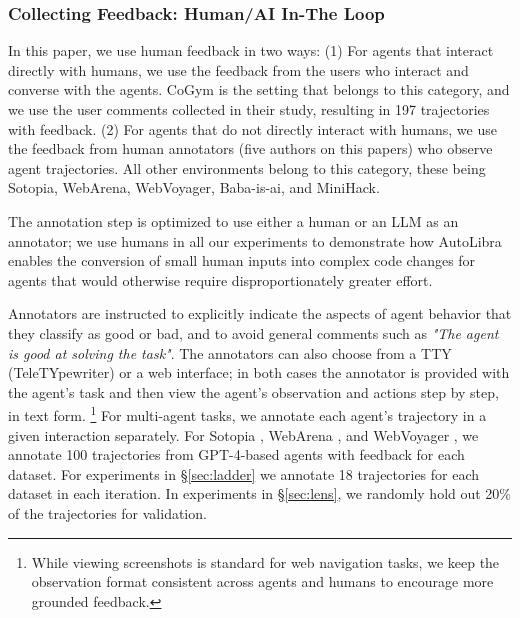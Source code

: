 \subsubsection{Collecting Feedback: Human/AI In-The Loop}
\label{sec:collecting-human-feedback}
In this paper, we use human feedback in two ways: (1) For agents that interact directly with humans, we use the feedback from the users who interact and converse with the agents. CoGym \citep{shao2024collaborative}
is the setting that belongs to this category, and we use the user comments collected in their study, resulting
in 197 trajectories with feedback. (2) For agents that
do not directly interact with humans, we use the feedback from human annotators (five authors on this papers) who observe agent trajectories. All other environments belong to this category, these being Sotopia, WebArena, WebVoyager, Baba-is-ai, and MiniHack.

The annotation step is optimized to use either a human or an LLM as an annotator; we use humans in all our experiments to demonstrate how AutoLibra enables the conversion of small human inputs into complex code changes for agents that would otherwise require disproportionately greater effort.

Annotators are instructed to explicitly indicate the aspects of agent behavior that they classify as good or bad,
and to avoid general comments such as \textit{"The agent is good at solving the task"}.
The annotators can also choose from a TTY (TeleTYpewriter) or a web interface; in both cases the annotator is provided with the agent's task
and then view the agent's observation and actions step by step, in text form. \footnote{While viewing screenshots is standard for web navigation tasks, we keep the observation format consistent across agents and humans to encourage more grounded feedback.}
For multi-agent tasks, we annotate each agent's trajectory in a given interaction separately. For Sotopia \citep{zhousotopia}, WebArena \citep{zhouwebarena},
and WebVoyager \citep{he2024webvoyager}, we annotate 100 trajectories from GPT-4-based \citep{achiam2023gpt} agents with feedback for each dataset. For experiments in \S\ref{sec:ladder} we annotate 18 trajectories for each dataset in each
iteration. In experiments in \S\ref{sec:lens}, we randomly hold out 20\% of the trajectories for validation.

